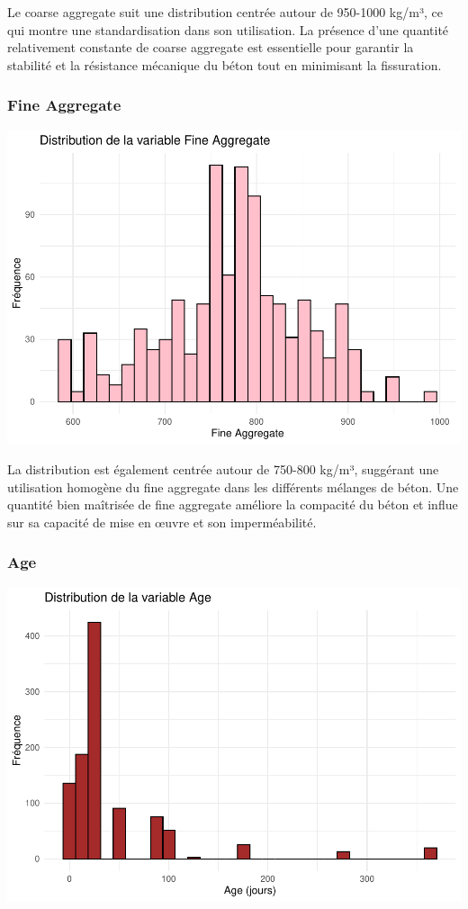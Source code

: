 \documentclass[
  12pt,
]{article}
\begin{document}
Le coarse aggregate suit une distribution centrée autour de 950-1000
kg/m³, ce qui montre une standardisation dans son utilisation. La
présence d'une quantité relativement constante de coarse aggregate est
essentielle pour garantir la stabilité et la résistance mécanique du
béton tout en minimisant la fissuration.

\subsubsection{Fine Aggregate}\label{fine-aggregate}

\includegraphics{rmd_final_files/figure-latex/unnamed-chunk-7-1.pdf}

La distribution est également centrée autour de 750-800 kg/m³, suggérant
une utilisation homogène du fine aggregate dans les différents mélanges
de béton. Une quantité bien maîtrisée de fine aggregate améliore la
compacité du béton et influe sur sa capacité de mise en œuvre et son
imperméabilité.

\subsubsection{Age}\label{age}

\includegraphics{rmd_final_files/figure-latex/unnamed-chunk-8-1.pdf}
\end{document}
